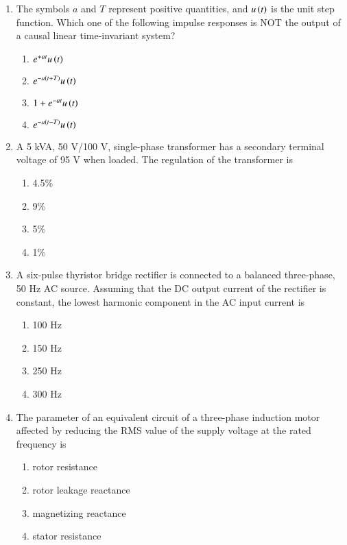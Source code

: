 \documentclass[journal]{IEEEtran}
\begin{document}
\begin{enumerate}
    \item The symbols $a$ and $T$ represent positive quantities, and $u\left(t\right)$ is the unit
    step function. Which one of the following impulse responses is NOT the output of a
    causal linear time-invariant system?
    \begin{multicols}{2}
    \begin{enumerate}
        \item $e^{+at}u\left(t\right)$
        \item $e^{-a\left(t+T\right)}u\left(t\right)$
        \item $1 + e^{-at}u\left(t\right)$
        \item $e^{-a\left(t-T\right)}u\left(t\right)$
    \end{enumerate}
    \end{multicols}
    
    \item A 5 kVA, 50 V/100 V, single-phase transformer has a secondary terminal voltage
    of 95 V when loaded. The regulation of the transformer is
    \begin{multicols}{4}
    \begin{enumerate}
        \item 4.5\%
        \item 9\%
        \item 5\%
        \item 1\%
    \end{enumerate}
    \end{multicols}
 
    \item A six-pulse thyristor bridge rectifier is connected to a balanced three-phase,
    50 Hz AC source. Assuming that the DC output current of the rectifier is constant,
    the lowest harmonic component in the AC input current is
    \begin{multicols}{4}
    \begin{enumerate}
        \item 100 Hz
        \item 150 Hz
        \item 250 Hz
        \item 300 Hz
    \end{enumerate}
    \end{multicols}

    \item The parameter of an equivalent circuit of a three-phase induction motor affected
    by reducing the RMS value of the supply voltage at the rated frequency is
    \begin{enumerate}
        \item rotor resistance
        \item rotor leakage reactance
        \item magnetizing reactance
        \item stator resistance
    \end{enumerate}


\end{enumerate}
\end{document}
